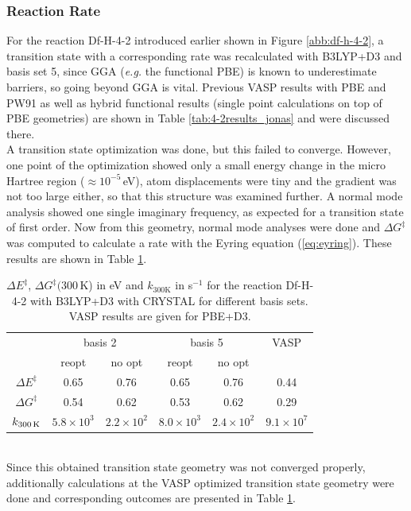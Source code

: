 \documentclass[11pt,DIV=13,BCOR=5mm,a4paper,headinclude]{scrbook}
\newcommand\todo[1]{\textcolor{red}{TODO: \textit{{#1}}}}
\begin{document}
\subsubsection{Reaction Rate}
For the reaction Df-H-4-2 introduced earlier shown in Figure \ref{abb:df-h-4-2}, a transition state with a corresponding rate was recalculated with B3LYP+D3 and basis set 5, since GGA (\textit{e.g.} the functional PBE) is known to underestimate barriers\cite{Zhao05}, so going beyond GGA is vital.
Previous VASP results with PBE and PW91 as well as hybrid functional results (single point calculations on top of PBE geometries) are shown in Table \ref{tab:4-2results_jonas} and were discussed there.
\\
A transition state optimization was done, but this failed to converge.
However, one point of the optimization showed only a small energy change in the micro Hartree region ($\approx 10^{-5}\,$eV), atom displacements were tiny and the gradient was not too large either, so that this structure was examined further.
A normal mode analysis showed one single imaginary frequency, as expected for a transition state of first order.
Now from this geometry, normal mode analyses were done and $\Delta G^\ddagger$ was computed to calculate a rate with the Eyring equation (\ref{eq:eyring}).
These results are shown in Table \ref{tab:k_crystal-reopt+noopt}.
\begin{table}[!h]
  \centering
  \caption{$\Delta E^\ddagger$, $\Delta G^\ddagger(300\,$K) in eV and $k_\textrm{300K}$ in s$^{-1}$ for the reaction Df-H-4-2 with B3LYP+D3 with CRYSTAL for different basis sets. VASP results are given for PBE+D3.}
  \begin{tabular}{c|cc|cc|c}%
  \toprule
   & \multicolumn{2}{c}{basis 2} &\multicolumn{2}{c}{basis 5}  &VASP\\ %
   & reopt & no opt & reopt & no opt & \\\midrule %
   $\Delta E^\ddagger$ &0.65 &0.76 &0.65 & 0.76 &0.44\\%
   $\Delta G^\ddagger$ &0.54 &0.62 &0.53 &0.62 &0.29\\%
   $k_\textrm{300\,K}$ &$5.8\times 10^3$ &$2.2\times 10^2$ &$8.0\times 10^3$ &$2.4\times 10^2$ &$9.1\times 10^7$\\\bottomrule%
  \end{tabular}
  \label{tab:k_crystal-reopt+noopt}
\end{table}
\\
Since this obtained transition state geometry was not converged properly, additionally calculations at the VASP optimized transition state geometry were done and corresponding  outcomes are presented in Table \ref{tab:k_crystal-reopt+noopt}.
\end{document}
